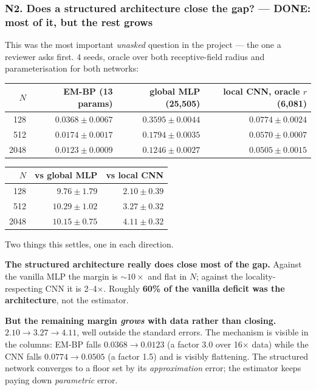 \documentclass[11pt,a4paper]{article}
\newcommand{\done}{\textcolor{GoodGreen}{\textbf{DONE}}}
\begin{document}
\subsubsection*{N2. Does a structured architecture close the gap? --- \done: most of it, but the rest grows}
\label{sec:receptive}

This was the most important \emph{unasked} question in the project --- the one a reviewer
asks first. 4 seeds, oracle over both receptive-field radius and parameterisation for both
networks:

\begin{center}
\begin{tabular}{@{}rrrr@{}}
\toprule
$N$ & \textbf{EM-BP} (13 params) & global MLP (25{,}505) & local CNN, oracle $r$ (6{,}081) \\
\midrule
128  & $\mathbf{0.0368 \pm 0.0067}$ & $0.3595 \pm 0.0044$ & $0.0774 \pm 0.0024$ \\
512  & $\mathbf{0.0174 \pm 0.0017}$ & $0.1794 \pm 0.0035$ & $0.0570 \pm 0.0007$ \\
2048 & $\mathbf{0.0123 \pm 0.0009}$ & $0.1246 \pm 0.0027$ & $0.0505 \pm 0.0015$ \\
\bottomrule
\end{tabular}
\end{center}

\begin{center}
\begin{tabular}{@{}rrr@{}}
\toprule
$N$ & vs global MLP & vs local CNN \\
\midrule
128  & $9.76 \pm 1.79$ & $2.10 \pm 0.39$ \\
512  & $10.29 \pm 1.02$ & $3.27 \pm 0.32$ \\
2048 & $10.15 \pm 0.75$ & $\mathbf{4.11 \pm 0.32}$ \\
\bottomrule
\end{tabular}
\end{center}

\noindent
Two things this settles, one in each direction.

\textbf{The structured architecture really does close most of the gap.} Against the vanilla
MLP the margin is ${\sim}10\times$ and flat in $N$; against the locality-respecting CNN it is
2--4$\times$. Roughly \textbf{60\% of the vanilla deficit was the architecture}, not the
estimator.

\textbf{But the remaining margin \emph{grows} with data rather than closing.}
$2.10 \to 3.27 \to 4.11$, well outside the standard errors. The mechanism is visible in the
columns: EM-BP falls $0.0368 \to 0.0123$ (a factor 3.0 over 16$\times$ data) while the CNN
falls $0.0774 \to 0.0505$ (a factor 1.5) and is visibly flattening. The structured network
converges to a floor set by its \emph{approximation} error; the estimator keeps paying down
\emph{parametric} error.
\end{document}

